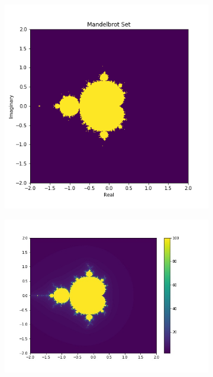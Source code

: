 \documentclass{article}
\begin{document}
\begin{figure}[ht]
    \centering
    \captionsetup{justification=centering}
    \begin{subfigure}[t]{0.4\linewidth}
        \includegraphics[width=\linewidth]{images/mandel.png}
    \end{subfigure}
    \begin{subfigure}[t]{0.535\linewidth}
        \includegraphics[width=\linewidth]{images/mandel2.jpg}
    \end{subfigure}
    \captionsetup{justification=centering,margin=1cm}
    \caption{}
    \label{fig:B0353+52}
\end{figure}
\end{document}
